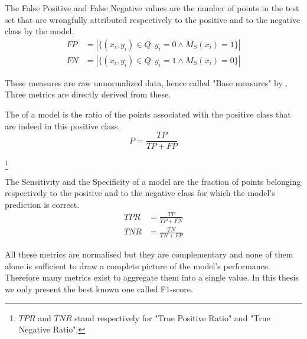 \begin{definition}
The False Positive and False Negative values are the number of points in the test set that are wrongfully attributed respectively to the positive and to the negative class by the model.
\begin{equation}
    \begin{array}{ll}
         FP & = |\{(x_i, y_i)\in Q: y_i = 0 \land M_S(x_i) = 1\}| \\
         FN & = |\{(x_i, y_i)\in Q: y_i = 1 \land M_S(x_i) = 0\}|
    \end{array}
\end{equation}
\end{definition}

These measures are raw unnormalized data, hence called "Base measures" by \cite{Canbek2017_Class_metrics_terminology}. Three metrics are directly derived from these.

\begin{definition}
The  of a model is the ratio of the points associated with the positive class that are indeed in this positive class.
\begin{equation}
    P = \frac{TP}{TP+FP}
\end{equation}
\end{definition}

\begin{definition}\footnote{$TPR$ and $TNR$ stand respectively for "True Positive Ratio" and "True Negative Ratio".}
    
    The Sensitivity and the Specificity of a model are the fraction of points belonging respectively to the positive and to the negative class for which the model's prediction is correct.
    \begin{equation}
        \begin{array}{ll}
             TPR & = \frac{TP}{TP+FN}  \\
             TNR & = \frac{TN}{TN+FP}
        \end{array}
    \end{equation}
\end{definition}

All these metrics are normalised but they are complementary and none of them alone is sufficient to draw a complete picture of the model's performance. Therefore many metrics exist to aggregate them into a single value. In this thesis we only present the best known one called F1-score.

